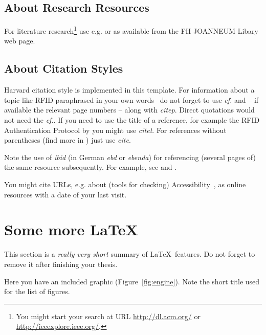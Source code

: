 \subsection{About Research Resources}
For literature research\footnote{You might start your search at URL \url{http://dl.acm.org/} or \url{http://ieeexplore.ieee.org/}.} use e.g.  \parencite{acm:diglibrary} or  \parencite{ieee:xplore} as available from the FH JOANNEUM Libary web page.

\subsection{About Citation Styles}
Harvard citation style is implemented in this template. For information about a topic like RFID paraphrased in your own words~\citep[cf.][pg 317]{Batina:2011} do not forget to use \emph{cf.} and -- if available the relevant page numbers -- along with \emph{citep}. Direct quotations would not need the \emph{cf.}. If you need to use the title of a reference, for example the RFID Authentication Protocol by \citet{Fernandez-Mir:2011} you might use \emph{citet}. For references without parentheses (find more in \cite{Li:2008}) just use \emph{cite}.

Note the use of \emph{ibid} (in German \emph{ebd} or \emph{ebenda}) for referencing (several pages of) the same resource subsequently. For example, see \citep[cf.][pg 317]{Batina:2011} and \citep[cf.][pg 321]{Batina:2011} \citep[cf.][pg 399]{Batina:2011}.

You might cite URLs, e.g. about (tools for checking) Accessibility~\citep[cf.][]{Google:2017a,Google:2016a}, as online resources with a date of your last visit.


\section{Some more \LaTeX}
This section is a \textit{really very short} summary of \LaTeX\ features. Do not forget to remove it after finishing your thesis.

Here you have an included graphic (Figure~\ref{fig:engine}). Note the short title used for the list of figures.


